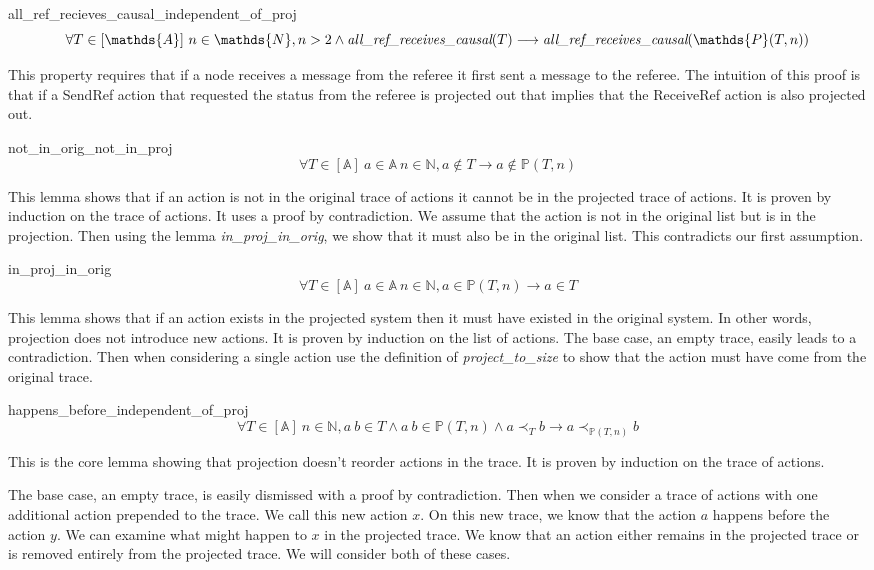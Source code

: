 \documentclass[runningheads]{llncs}
\newcommand{\action}{\mathds{A}}
\newcommand{\listaction}{[\action]}
\newcommand{\happensbefore}{\prec_T}
\newcommand{\projectsize}[2]{\mathds{P}(#1, #2)}
\newcommand{\allrrc}[1]{\emph{all\_ref\_receives\_causal}(#1)}
\begin{document}
\begin{lemma}{all\_ref\_recieves\_causal\_independent\_of\_proj}
$$ \forall T \in \listaction\ n \in \mathds{N}, n > 2 \wedge \allrrc{T} \longrightarrow \allrrc{\projectsize{T}{n}} $$
\end{lemma}
This property requires that if a node receives a message from the referee it first sent a message to the referee. The intuition of this proof is that if a SendRef action that requested the status from the referee is projected out that implies that the ReceiveRef action is also projected out.

\begin{lemma}{not\_in\_orig\_not\_in\_proj}
$$ \forall T \in \listaction\ a \in \action\ n \in \mathds{N}, a \notin T  \longrightarrow a \notin \projectsize{T}{n} $$
\end{lemma}
This lemma shows that if an action is not in the original trace of actions it cannot be in the projected trace of actions. It is proven by induction on the trace of actions. It uses a proof by contradiction. We assume that the action is not in the original list but is in the projection. Then using the lemma \emph{in\_proj\_in\_orig}, we show that it must also be in the original list. This contradicts our first assumption.

\begin{lemma}{in\_proj\_in\_orig}
$$ \forall T \in \listaction\ a \in \action\ n \in \mathds{N}, a \in \projectsize{T}{n} \longrightarrow  a \in T $$
\end{lemma}
This lemma shows that if an action exists in the projected system then it must have existed in the original system. In other words, projection does not introduce new actions.
 It is proven by induction on the list of actions. The base case, an empty trace, easily leads to a contradiction. Then when considering a single action use the definition of \emph{project\_to\_size} to show that the action must have come from the original trace. 

\begin{lemma}{happens\_before\_independent\_of\_proj}
$$ \forall T \in \listaction\ n \in \mathds{N},
a\ b \in T \wedge a\ b \in \projectsize{T}{n} \wedge a \happensbefore b \longrightarrow a \prec_{\projectsize{T}{n}} b
$$
\end{lemma}
This is the core lemma showing that projection doesn't reorder actions in the trace. It is proven by induction on the trace of actions. 

The base case, an empty trace, is easily dismissed with a proof by contradiction. 
Then when we consider a trace of actions with one additional action prepended to the trace. We call this new action $x$. On this new trace, we know that the action $a$ happens before the action $y$.
We can examine what might happen to $x$ in the projected trace.
We know that an action either remains in the projected trace or is removed entirely from the projected trace.
We will consider both of these cases.
\end{document}
